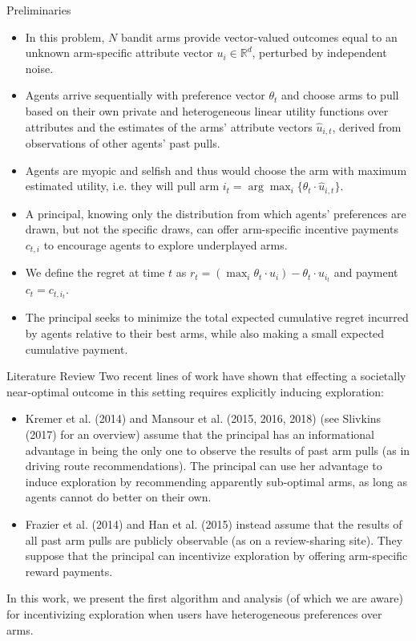 \documentclass[final]{beamer} %
\begin{document}
\begin{frame}[t]
\begin{columns}[t]
\begin{column}{0.28\paperwidth}
\begin{block}{Preliminaries}
\begin{itemize}[label=\textbullet]
\item In this problem, $N$ bandit arms provide vector-valued outcomes equal to an unknown arm-specific attribute vector $u_{i}\in \mathbb{R}^{d}$, perturbed by independent noise. 
\item Agents arrive sequentially with preference vector $\theta_t$ and choose arms to pull based on their own private and heterogeneous linear utility functions over attributes and the estimates of the arms’ attribute vectors $\hat{u}_{i,t}$, derived from observations of other agents’ past pulls. 
\item Agents are myopic and selfish and thus would choose the arm with maximum estimated utility, i.e. they will pull arm $i_t = \arg\max_{i}\{\theta_{t}\cdot \hat{u}_{i,t}\}$.
\item  A principal, knowing only the distribution from which agents’ preferences are drawn, but not the specific draws, can offer arm-specific incentive payments $c_{t,i}$ to encourage agents to explore underplayed arms. 
\item We define the regret at time $t$ as $r_t = (\max_{i} \theta_t \cdot u_i) - \theta_t \cdot u_{i_t}$ and payment $c_t = c_{t,i_t}$.
\item The principal seeks to minimize the total expected cumulative regret incurred by agents relative to their best arms, while also making a small expected cumulative payment.
\end{itemize}
\end{block}

\begin{block}{Literature Review}
Two recent lines of work have shown that effecting a societally near-optimal outcome in this setting requires explicitly inducing exploration:
\begin{itemize}[label=\textbullet]
\item Kremer et al. (2014) and Mansour et al. (2015, 2016, 2018) (see Slivkins (2017) for an overview) assume that the principal has an informational advantage in being the only one to observe the results of past arm pulls (as in driving route recommendations). The principal can use her advantage to induce exploration by recommending apparently sub-optimal arms, as long as agents cannot do better on their own.
\item Frazier et al. (2014) and Han et al. (2015) instead assume that the results of all past arm pulls are publicly observable (as on a review-sharing site). They suppose that the principal can incentivize exploration by offering arm-specific reward payments.
\end{itemize}
In this work, we present the first algorithm and analysis (of which we are aware) for incentivizing exploration when users have heterogeneous preferences over arms.\end{block}
\end{column}


\end{columns}
\end{frame}
\end{document}
